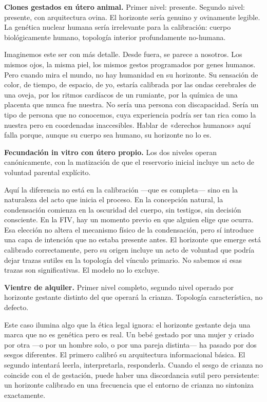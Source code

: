 \textbf{Clones gestados en útero animal.} Primer nivel: presente. Segundo nivel: presente, con arquitectura ovina. El horizonte sería genuino y ovinamente legible. La genética nuclear humana sería irrelevante para la calibración: cuerpo biológicamente humano, topología interior profundamente no-humana.

Imaginemos este ser con más detalle. Desde fuera, se parece a nosotros. Los mismos ojos, la misma piel, los mismos gestos programados por genes humanos. Pero cuando mira el mundo, no hay humanidad en su horizonte. Su sensación de color, de tiempo, de espacio, de yo, estaría calibrada por las ondas cerebrales de una oveja, por los ritmos cardíacos de un rumiante, por la química de una placenta que nunca fue nuestra. No sería una persona con discapacidad. Sería un tipo de persona que no conocemos, cuya experiencia podría ser tan rica como la nuestra pero en coordenadas inaccesibles. Hablar de «derechos humanos» aquí falla porque, aunque su cuerpo sea humano, su horizonte no lo es.

\textbf{Fecundación in vitro con útero propio.} Los dos niveles operan canónicamente, con la matización de que el reservorio inicial incluye un acto de voluntad parental explícito.

Aquí la diferencia no está en la calibración —que es completa— sino en la naturaleza del acto que inicia el proceso. En la concepción natural, la condensación comienza en la oscuridad del cuerpo, sin testigos, sin decisión consciente. En la FIV, hay un momento previo en que alguien elige que ocurra. Esa elección no altera el mecanismo físico de la condensación, pero sí introduce una capa de intención que no estaba presente antes. El horizonte que emerge está calibrado correctamente, pero su origen incluye un acto de voluntad que podría dejar trazas sutiles en la topología del vínculo primario. No sabemos si esas trazas son significativas. El modelo no lo excluye.

\textbf{Vientre de alquiler.} Primer nivel completo, segundo nivel operado por horizonte gestante distinto del que operará la crianza. Topología característica, no defecto.

Este caso ilumina algo que la ética legal ignora: el horizonte gestante deja una marca que no es genética pero es real. Un bebé gestado por una mujer y criado por otra —o por un hombre solo, o por una pareja distinta— ha pasado por dos sesgos diferentes. El primero calibró su arquitectura informacional básica. El segundo intentará leerla, interpretarla, responderla. Cuando el sesgo de crianza no coincide con el de gestación, puede haber una discordancia sutil pero persistente: un horizonte calibrado en una frecuencia que el entorno de crianza no sintoniza exactamente.

